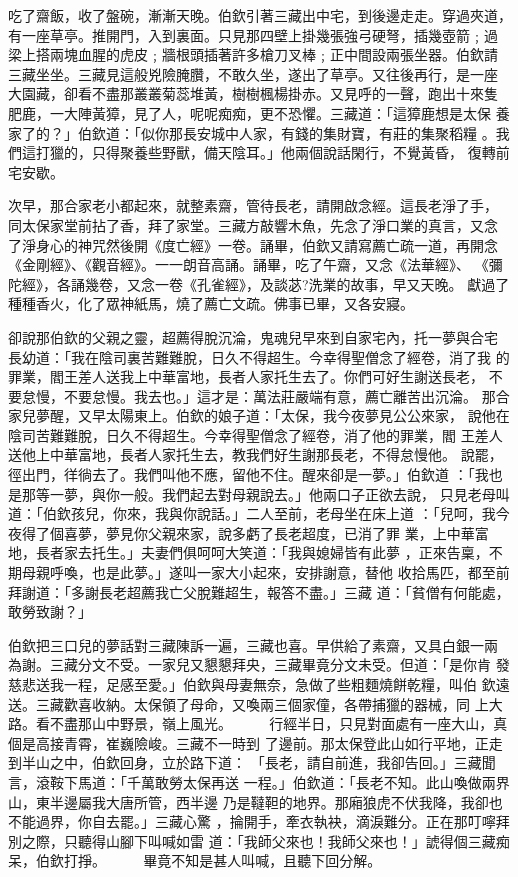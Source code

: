 \begin{pinyinscope}
{吃了齋飯，收了盤碗，漸漸天晚。伯欽引著三藏出中宅，到後邊走走。穿過夾道，
有一座草亭。推開門，入到裏面。只見那四壁上掛幾張強弓硬弩，插幾壺箭﹔過
梁上搭兩塊血腥的虎皮﹔牆根頭插著許多槍刀叉棒﹔正中間設兩張坐器。伯欽請
三藏坐坐。三藏見這般兇險腌臢，不敢久坐，遂出了草亭。又往後再行，是一座
大園藏，卻看不盡那叢叢菊蕊堆黃，樹樹楓楊掛赤。又見呼的一聲，跑出十來隻
肥鹿，一大陣黃獐，見了人，呢呢痴痴，更不恐懼。三藏道：「這獐鹿想是太保
養家了的？」伯欽道：「似你那長安城中人家，有錢的集財寶，有莊的集聚稻糧
。我們這打獵的，只得聚養些野獸，備天陰耳。」他兩個說話閑行，不覺黃昏，
復轉前宅安歇。

次早，那合家老小都起來，就整素齋，管待長老，請開啟念經。這長老淨了手，
同太保家堂前拈了香，拜了家堂。三藏方敲響木魚，先念了淨口業的真言，又念
了淨身心的神咒然後開《度亡經》一卷。誦畢，伯欽又請寫薦亡疏一道，再開念
《金剛經》、《觀音經》。一一朗音高誦。誦畢，吃了午齋，又念《法華經》、
《彌陀經》，各誦幾卷，又念一卷《孔雀經》，及談苾?洗業的故事，早又天晚。
獻過了種種香火，化了眾神紙馬，燒了薦亡文疏。佛事已畢，又各安寢。

卻說那伯欽的父親之靈，超薦得脫沉淪，鬼魂兒早來到自家宅內，托一夢與合宅
長幼道：「我在陰司裏苦難難脫，日久不得超生。今幸得聖僧念了經卷，消了我
的罪業，閻王差人送我上中華富地，長者人家托生去了。你們可好生謝送長老，
不要怠慢，不要怠慢。我去也。」這才是：萬法莊嚴端有意，薦亡離苦出沉淪。
那合家兒夢醒，又早太陽東上。伯欽的娘子道：「太保，我今夜夢見公公來家，
說他在陰司苦難難脫，日久不得超生。今幸得聖僧念了經卷，消了他的罪業，閻
王差人送他上中華富地，長者人家托生去，教我們好生謝那長老，不得怠慢他。
說罷，徑出門，徉徜去了。我們叫他不應，留他不住。醒來卻是一夢。」伯欽道
：「我也是那等一夢，與你一般。我們起去對母親說去。」他兩口子正欲去說，
只見老母叫道：「伯欽孩兒，你來，我與你說話。」二人至前，老母坐在床上道
：「兒呵，我今夜得了個喜夢，夢見你父親來家，說多虧了長老超度，已消了罪
業，上中華富地，長者家去托生。」夫妻們俱呵呵大笑道：「我與媳婦皆有此夢
，正來告稟，不期母親呼喚，也是此夢。」遂叫一家大小起來，安排謝意，替他
收拾馬匹，都至前拜謝道：「多謝長老超薦我亡父脫難超生，報答不盡。」三藏
道：「貧僧有何能處，敢勞致謝？」

伯欽把三口兒的夢話對三藏陳訴一遍，三藏也喜。早供給了素齋，又具白銀一兩
為謝。三藏分文不受。一家兒又懇懇拜央，三藏畢竟分文未受。但道：「是你肯
發慈悲送我一程，足感至愛。」伯欽與母妻無奈，急做了些粗麵燒餅乾糧，叫伯
欽遠送。三藏歡喜收納。太保領了母命，又喚兩三個家僮，各帶捕獵的器械，同
上大路。看不盡那山中野景，嶺上風光。
　　
行經半日，只見對面處有一座大山，真個是高接青霄，崔巍險峻。三藏不一時到
了邊前。那太保登此山如行平地，正走到半山之中，伯欽回身，立於路下道：
「長老，請自前進，我卻告回。」三藏聞言，滾鞍下馬道：「千萬敢勞太保再送
一程。」伯欽道：「長老不知。此山喚做兩界山，東半邊屬我大唐所管，西半邊
乃是韃靼的地界。那廂狼虎不伏我降，我卻也不能過界，你自去罷。」三藏心驚
，掄開手，牽衣執袂，滴淚難分。正在那叮嚀拜別之際，只聽得山腳下叫喊如雷
道：「我師父來也！我師父來也！」諕得個三藏痴呆，伯欽打掙。
　　
    畢竟不知是甚人叫喊，且聽下回分解。





}
\end{pinyinscope}
